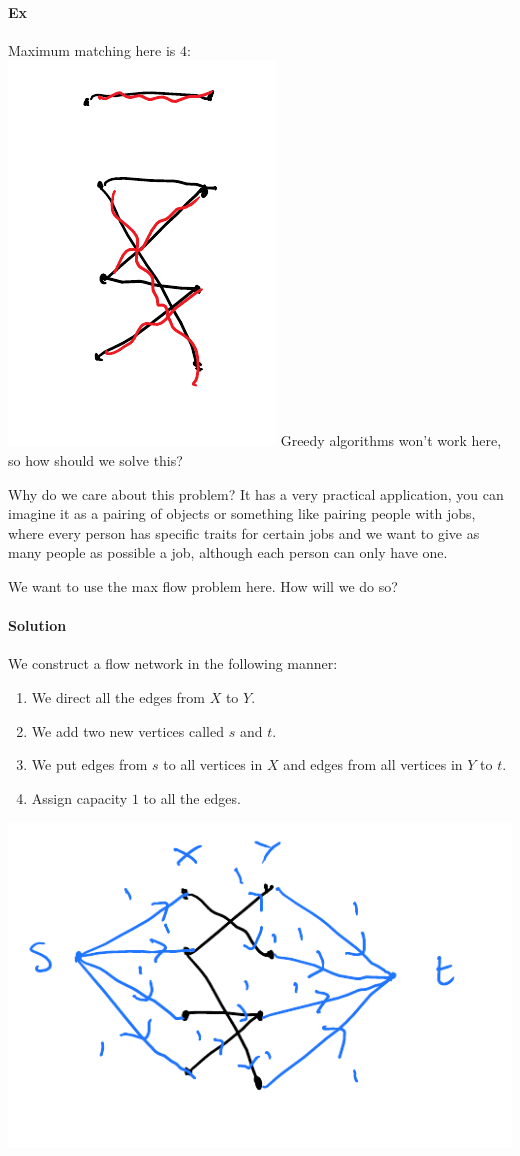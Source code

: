 \documentclass[12 pt]{article}
\begin{document}
        \paragraph{Ex} Maximum matching here is $4$:
        \\ \includegraphics[width=.5\textwidth]{i49.pdf} Greedy
        algorithms won't work here, so how should we solve this?

        Why do we care about this problem? It has a very practical
        application, you can imagine it as a pairing of objects or
        something like pairing people with jobs, where every person
        has specific traits for certain jobs and we want to give as
        many people as possible a job, although each person can only
        have one.

        We want to use the max flow problem here. How will we do so?
        \paragraph{Solution} We construct a flow network in the
        following manner: 
        \begin{enumerate}
        \item We direct all the edges from $X$ to $Y$.
        \item We add two new vertices called $s$ and $t$.
        \item We put edges from $s$ to all vertices in $X$ and edges
          from all vertices in $Y$ to $t$.
        \item Assign capacity $1$ to all the edges.
        \end{enumerate}
        \includegraphics[width=.9\textwidth]{i50.pdf}
\end{document}
